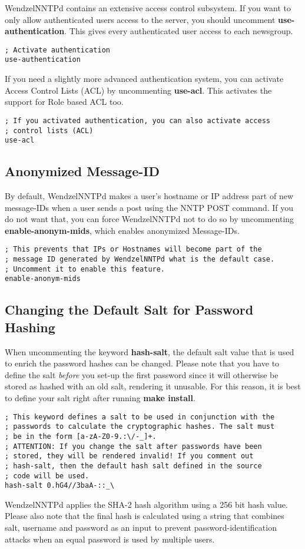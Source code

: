 WendzelNNTPd contains an extensive access control subsystem. If you want to only allow authenticated users access to the server, you should uncomment {\bf use-authentication}. This gives every authenticated user access to each newsgroup.

\begin{verbatim}
; Activate authentication
use-authentication
\end{verbatim}

If you need a slightly more advanced authentication system, you can activate Access Control Lists (ACL) by uncommenting {\bf use-acl}. This activates the support for Role based ACL too.

\begin{verbatim}
; If you activated authentication, you can also activate access
; control lists (ACL)
use-acl
\end{verbatim}

\subsection{Anonymized Message-ID}

By default, WendzelNNTPd makes a user's hostname or IP address part of new message-IDs when a user sends a post using the NNTP POST command. If you do not want that, you can force WendzelNNTPd not to do so by uncommenting {\bf enable-anonym-mids}, which enables anonymized Message-IDs.

\begin{verbatim}
; This prevents that IPs or Hostnames will become part of the
; message ID generated by WendzelNNTPd what is the default case.
; Uncomment it to enable this feature.
enable-anonym-mids
\end{verbatim}

\subsection{Changing the Default Salt for Password Hashing}

When uncommenting the keyword {\bf hash-salt}, the default salt value that is used to enrich the password hashes can be changed. Please note that you have to define the salt {\it before} you set-up the first password since it will otherwise be stored as hashed with an old salt, rendering it unusable. For this reason, it is best to define your salt right after running {\bf make install}.

\begin{verbatim}
; This keyword defines a salt to be used in conjunction with the
; passwords to calculate the cryptographic hashes. The salt must
; be in the form [a-zA-Z0-9.:\/-_]+.
; ATTENTION: If you change the salt after passwords have been
; stored, they will be rendered invalid! If you comment out
; hash-salt, then the default hash salt defined in the source
; code will be used.
hash-salt 0.hG4//3baA-::_\
\end{verbatim}

WendzelNNTPd applies the SHA-2 hash algorithm using a 256 bit hash value. Please also note that the final hash is calculated using a string that combines salt, username and password as an input to prevent password-identification attacks when an equal password is used by multiple users.



